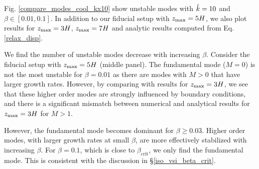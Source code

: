 Fig. \ref{compare_modes_cool_kx10} show unstable modes with $\hat{k}=10$ 
and $\beta\in[0.01,0.1]$. In addition to our fiducial setup with 
$z_\mathrm{max}=5H$, we also plot results for $z_\mathrm{max}=3H$, $z_\mathrm{max}=7H$ and 
analytic results computed from Eq. \ref{relax_disp}.  %

We find the number of unstable modes decrease with increasing
$\beta$. Consider the fiducial setup with $z_\mathrm{max}=5H$ 
(middle panel). The fundamental mode ($M=0$) is not the most unstable for   
$\beta=0.01$ as there are modes with $M>0$ that have larger growth 
rates. However, by comparing with results for $z_\mathrm{max}=3H$, we see that these
higher order modes are strongly influenced by boundary conditions, and
there is a significant mismatch between numerical and analytical
results for $z_\mathrm{max}=3H$ for $M>1$.   

However, the fundamental mode becomes dominant for $\beta \geq 
0.03$. Higher order modes, with larger growth rates at small $\beta$,
are more effectively stabilized with increasing $\beta$. For
$\beta=0.1$, which is close to $\beta_\mathrm{crit}$, we only find the
fundamental mode. This is consistent with the discussion in 
\S\ref{iso_vsi_beta_crit}.    

